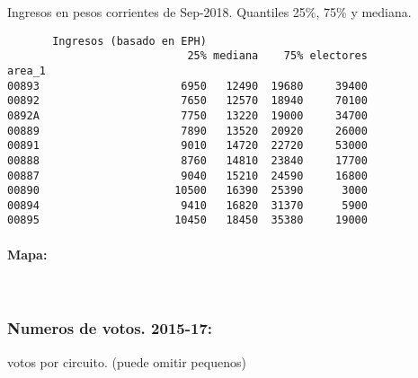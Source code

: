 \documentclass[11pt]{article}
\begin{document}
    
    Ingresos en pesos corrientes de Sep-2018. Quantiles 25\%, 75\% y
mediana.

    
    
    \begin{verbatim}
       Ingresos (basado en EPH)                         
                            25% mediana    75% electores
area_1                                                  
00893                      6950   12490  19680     39400
00892                      7650   12570  18940     70100
0892A                      7750   13220  19000     34700
00889                      7890   13520  20920     26000
00891                      9010   14720  22720     53000
00888                      8760   14810  23840     17700
00887                      9040   15210  24590     16800
00890                     10500   16390  25390      3000
00894                      9410   16820  31370      5900
00895                     10450   18450  35380     19000
    \end{verbatim}

    
    \hypertarget{mapa}{%
\paragraph{Mapa:}\label{mapa}}

    
    \begin{center}
    \end{center}
    { \hspace*{\fill} \\}
    
    \hypertarget{numeros-de-votos.-2015-17}{%
\subsubsection{Numeros de votos.
2015-17:}\label{numeros-de-votos.-2015-17}}

    
    votos por circuito. (puede omitir pequenos)

    
    
\end{document}
